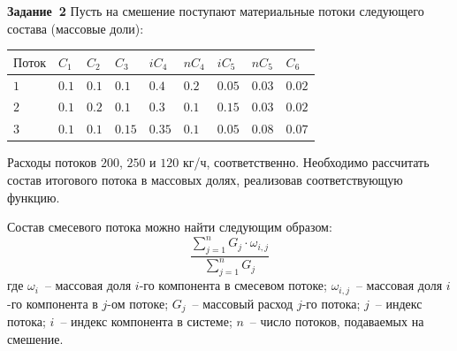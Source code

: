\documentclass[aspectratio=169, mathserif]{beamer}%
\begin{document}
\begin{frame}[fragile]{\textcolor{tpugreen}{\textbf{Задание~2}}}
\scriptsize
Пусть на смешение поступают материальные потоки следующего состава (массовые доли):
\vfill
\begin{table}[h!]
	\begin{tabular}{|p{.2\linewidth}|p{.05\linewidth}|p{.05\linewidth}|p{.05\linewidth}|p{.05\linewidth}|p{.05\linewidth}|p{.05\linewidth}|p{.05\linewidth}|p{.05\linewidth}|}
		\hline
		$\mathrm{Поток}$ & $C_1$ & $C_2$ & $C_3$ & $iC_4$ & $nC_4$ & $iC_5$ & $nC_5$ & $C_6$ \\
		\hline
		$1$ & $0.1$ & $0.1$ & $0.1$ & $0.4$ & $0.2$ & $0.05$ & $0.03$ & $0.02$ \\
		\hline
		$2$ & $0.1$ & $0.2$ & $0.1$ & $0.3$ & $0.1$ & $0.15$ & $0.03$ & $0.02$ \\
		\hline
		$3$ & $0.1$ & $0.1$ & $0.15$ & $0.35$ & $0.1$ & $0.05$ & $0.08$ & $0.07$ \\
		\hline
	\end{tabular}
\end{table}
\vfill
Расходы потоков $200$, $250$ и $120$ кг/ч, соответственно.
Необходимо рассчитать состав итогового потока в массовых долях, реализовав соответствующую функцию.

Состав смесевого потока можно найти следующим образом:
$$
	\dfrac{\sum\limits_{j=1}^{n}G_j \cdot \omega_{i, j}}{\sum\limits_{j=1}^{n}G_j}
$$
\vfill
где $\omega_i$~-- массовая доля $i$-го компонента в смесевом потоке; $\omega_{i, j}$~-- массовая доля $i$-го компонента в $j$-ом потоке; $G_j$~-- массовый расход $j$-го потока; $j$~-- индекс потока; $i$~-- индекс компонента в системе; $n$~-- число потоков, подаваемых на смешение.
\vfill
\end{frame}

\end{document}
